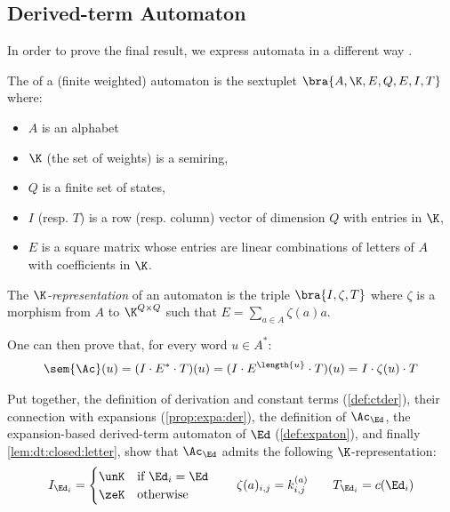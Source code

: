 \documentclass[a4paper,USenglish]{lipics}
\begin{document}
\subsection{Derived-term Automaton}
\label{sec:dt-aut}
In order to prove the final result, we express automata in a different way
\citep[Sect.~5]{lombardy.2005.tcs}.

\begin{Definition}
  The  of a (finite weighted) automaton is the
  sextuplet $\bra{A, \K, E, Q, E, I, T}$ where:
  \begin{itemize}
  \item $A$ is an alphabet
  \item $\K$ (the set of weights) is a semiring,
  \item $Q$ is a finite set of states,
  \item $I$ (resp. $T$) is a row (resp. column) vector of dimension $Q$ with
    entries in $\K$,
  \item $E$ is a square matrix whose entries are linear combinations of
    letters of $A$ with coefficients in $\K$.
  \end{itemize}

  \medskip

  The \emph{$\K$-representation} of an automaton is the triple
  $\bra{I, \zeta, T}$ where $\zeta$ is a morphism from $A$ to
  $\K^{Q \times Q}$ such that $E = \sum_{a\in A}\zeta(a)a$.
\end{Definition}

One can then prove that, for every word $u\in A^*$:
\begin{gather*}
  \sem{\Ac}(u)
  = (I \cdot E^* \cdot T)(u)
  = (I \cdot E^{\length{u}} \cdot T)(u)
  = I \cdot \zeta(u) \cdot T
\end{gather*}

Put together, the definition of derivation and constant terms
(\cref{def:ctder}), their connection with expansions (\cref{prop:expa:der}),
the definition of $\Ac_\Ed$, the expansion-based derived-term automaton of
$\Ed$ (\cref{def:expaton}), and finally \cref{lem:dt:closed:letter}, show
that $\Ac_\Ed$ admits the following $\K$-representation:
\begin{gather*}
  I_{\Ed_i}
  =
    \begin{cases}
      \unK & \text{if $\Ed_i = \Ed$} \\
      \zeK & \text{otherwise}
    \end{cases}
  \qquad
\zeta(a)_{i,j} = k_{i, j}^{(a)}
  \qquad
  T_{\Ed_i}
   = c(\Ed_i)
\end{gather*}
\end{document}
